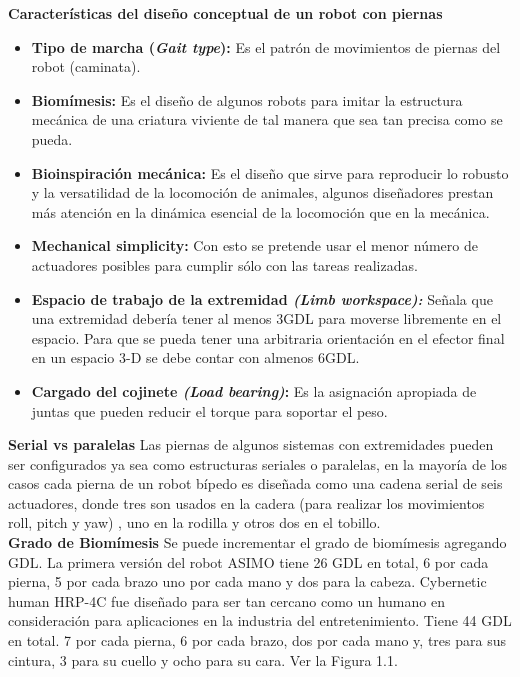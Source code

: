 \documentclass{book}
\begin{document}
\textbf{Características del diseño conceptual de un robot con piernas}				
\begin{itemize}
\item \textbf{Tipo de marcha (\textit{Gait type}):} Es el patrón de movimientos de piernas del robot (caminata).

\item \textbf{Biomímesis:} Es el diseño de algunos robots para imitar la estructura mecánica de una criatura viviente de tal manera que sea tan precisa como se pueda.

\item \textbf{Bioinspiración mecánica:} Es el diseño que sirve para reproducir lo robusto y la versatilidad de la locomoción de animales, algunos diseñadores prestan más atención en la dinámica esencial de la locomoción que en la mecánica.

\item \textbf{Mechanical simplicity:} Con esto se pretende usar el menor número de actuadores posibles para cumplir sólo con las tareas realizadas.

\item \textbf{Espacio de trabajo de la extremidad \textit{(Limb workspace):}} Señala que una extremidad debería tener al menos 3GDL para moverse libremente en el espacio. Para que se pueda tener una arbitraria orientación en el efector final en un espacio 3-D se debe contar con almenos 6GDL.

\item \textbf{Cargado del cojinete \textit{(Load bearing)}:} Es la asignación apropiada de juntas que pueden reducir el torque para soportar el peso. 
\end{itemize}


\textbf{Serial vs paralelas}
		Las piernas de algunos sistemas con extremidades pueden ser configurados ya sea como estructuras seriales o paralelas, en la mayoría de los casos cada pierna de un robot bípedo es diseñada como una cadena serial de seis actuadores, donde tres son usados en la cadera (para realizar los movimientos roll, pitch y yaw) , uno en la rodilla y otros dos en el tobillo.\\

		\textbf{Grado de Biomímesis}
	Se puede incrementar el grado de biomímesis agregando GDL.
La primera versión del robot ASIMO tiene 26 GDL en total, 6 por cada pierna, 5 por cada brazo uno por cada mano y dos para la cabeza. 
Cybernetic human HRP-4C fue diseñado para ser tan cercano como un humano en consideración para aplicaciones en la industria del entretenimiento. Tiene 44 GDL en total. 7 por cada pierna, 6 por cada brazo, dos por cada mano y, tres para sus cintura, 3 para su cuello y ocho para su cara. Ver la Figura 1.1. %
\\
\end{document}
